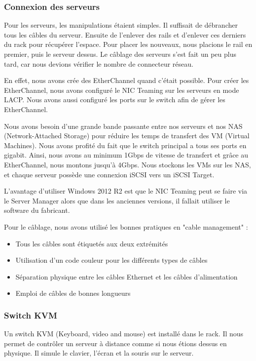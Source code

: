 \subsubsection{Connexion des serveurs}
Pour les serveurs, les manipulations étaient simples. 
Il suffisait de débrancher tous les câbles du serveur.
Ensuite de l'enlever des rails et d'enlever ces derniers du rack pour récupérer l'espace.
Pour placer les nouveaux, nous placions le rail en premier, puis le serveur dessus.
Le câblage des serveurs s'est fait un peu plus tard, car nous devions vérifier le nombre de connecteur réseau. 

En effet, nous avons crée des EtherChannel quand c'était possible.
Pour créer les EtherChannel, nous avons configuré le NIC Teaming sur les serveurs en mode LACP.
Nous avons aussi configuré les ports sur le switch afin de gérer les EtherChannel.
 
Nous avons besoin d'une grande bande passante entre nos serveurs et nos NAS (Network-Attached Storage) pour réduire les temps de transfert des VM (Virtual Machines).
Nous avons profité du fait que le switch principal a tous ses ports en gigabit. 
Ainsi, nous avons au minimum 1Gbps de vitesse de transfert et grâce au EtherChannel, nous montons jusqu'à 4Gbps.
Nous stockons les VMs sur les NAS, et chaque serveur possède une connexion iSCSI vers un iSCSI Target. 

L'avantage d'utiliser Windows 2012 R2 est que le NIC Teaming peut se faire via le Server Manager alors que dans les anciennes versions, il fallait utiliser le software du fabricant.


Pour le câblage, nous avons utilisé les bonnes pratiques en "cable management" :  
\begin{itemize}
\item Tous les câbles sont étiquetés aux deux extrémités
\item Utilisation d'un code couleur pour les différents types de câbles
\item Séparation physique entre les câbles Ethernet et les câbles d'alimentation
\item Emploi de câbles de bonnes longueurs
\end{itemize}

\subsubsection{Switch KVM}
Un switch KVM (Keyboard, video and mouse) est installé dans le rack.
Il nous permet de contrôler un serveur à distance comme si nous étions dessus en physique.
Il simule le clavier, l'écran et la souris sur le serveur. 

